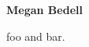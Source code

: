 \documentclass[12pt]{article}
\begin{document}
\sloppy\sloppypar\thispagestyle{empty}

\noindent
\textbf{Megan Bedell}
\smallskip

foo and bar.
\end{document}
